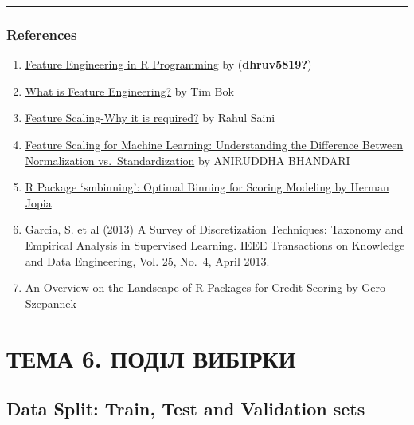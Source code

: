 \documentclass[
  letterpaper,
  DIV=11,
  numbers=noendperiod]{scrreprt}
\providecommand{\tightlist}{%
  \setlength{\itemsep}{0pt}\setlength{\parskip}{0pt}}\usepackage{longtable,booktabs,array}
\begin{document}
\begin{center}\rule{0.5\linewidth}{0.5pt}\end{center}

\section{References}\label{references-7}

\begin{enumerate}
\def\labelenumi{\arabic{enumi}.}
\tightlist
\item
  \href{https://www.geeksforgeeks.org/feature-engineering-in-r-programming/}{Feature
  Engineering in R Programming} by (\textbf{dhruv5819?})
\item
  \href{https://www.displayr.com/what-is-feature-engineering/}{What is
  Feature Engineering?} by Tim Bok
\item
  \href{https://medium.com/@rahul77349/feature-scaling-why-it-is-required-8a93df1af310}{Feature
  Scaling-Why it is required?} by Rahul Saini
\item
  \href{https://www.analyticsvidhya.com/blog/2020/04/feature-scaling-machine-learning-normalization-standardization/}{Feature
  Scaling for Machine Learning: Understanding the Difference Between
  Normalization vs.~Standardization} by ANIRUDDHA BHANDARI
\item
  \href{https://blog.revolutionanalytics.com/2015/03/r-package-smbinning-optimal-binning-for-scoring-modeling.html}{R
  Package `smbinning': Optimal Binning for Scoring Modeling by Herman
  Jopia}
\item
  Garcia, S. et al (2013) A Survey of Discretization Techniques:
  Taxonomy and Empirical Analysis in Supervised Learning. IEEE
  Transactions on Knowledge and Data Engineering, Vol. 25, No.~4, April
  2013.
\item
  \href{https://arxiv.org/pdf/2006.11835.pdf}{An Overview on the
  Landscape of R Packages for Credit Scoring by Gero Szepannek}
\end{enumerate}

\part{ТЕМА 6. ПОДІЛ ВИБІРКИ}

\chapter{Data Split: Train, Test and Validation
sets}\label{data-split-train-test-and-validation-sets}
\end{document}
